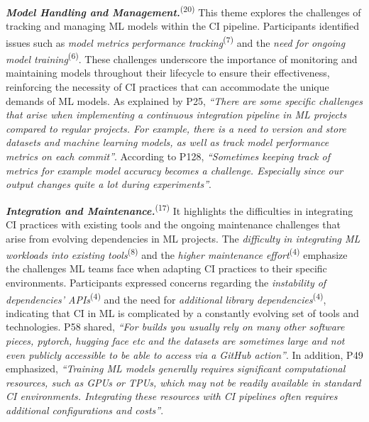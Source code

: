 \textbf{\textit{Model Handling and Management.}}\textsuperscript{(20)} 
This theme explores the challenges of tracking and managing ML models within the CI pipeline.
Participants identified issues such as\textit{ model metrics performance tracking}\textsuperscript{(7)} and the \textit{need for ongoing model training}\textsuperscript{(6)}. These challenges underscore the importance of monitoring and maintaining models throughout their lifecycle to ensure their effectiveness, reinforcing the necessity of CI practices that can accommodate the unique demands of ML models.
As explained by P25, \textit{``There are some specific challenges that arise when implementing a continuous integration pipeline in ML projects compared to regular projects. For example, there is a need to version and store datasets and machine learning models, as well as track model performance metrics on each commit''}.
According to P128, \textit{``Sometimes keeping track of metrics for example model accuracy becomes a challenge. Especially since our output changes quite a lot during experiments''}.




\textbf{\textit{Integration and Maintenance.}}\textsuperscript{(17)} 
It highlights the difficulties in integrating CI practices with existing tools and the ongoing maintenance challenges that arise from evolving dependencies in ML projects.
The \textit{difficulty in integrating ML workloads into existing tools}\textsuperscript{(8)} and the \textit{higher maintenance effort}\textsuperscript{(4)} emphasize the challenges ML teams face when adapting CI practices to their specific environments. Participants expressed concerns regarding the \textit{instability of dependencies' APIs}\textsuperscript{(4)} and the need for \textit{additional library dependencies}\textsuperscript{(4)}, indicating that CI in ML is complicated by a constantly evolving set of tools and technologies.
P58 shared, \textit{``For builds you usually rely on many other software pieces, pytorch, hugging face etc and the datasets are sometimes large and not even publicly accessible to be able to access via a GitHub action''}. 
In addition, P49 emphasized, \textit{``Training ML models generally requires significant computational resources, such as GPUs or TPUs, which may not be readily available in standard CI environments. Integrating these resources with CI pipelines often requires additional configurations and costs''}.


